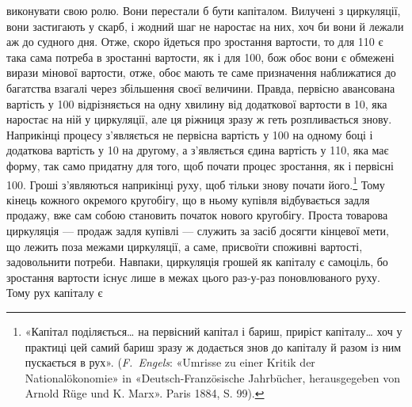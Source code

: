 \parcont{}  %
виконувати свою ролю. Вони перестали б бути капіталом. Вилучені
з циркуляції, вони застигають у скарб, і жодний шаг не наростає
на них, хоч би вони й лежали аж до судного дня. Отже,
скоро йдеться про зростання вартости, то для 110
є така сама потреба в зростанні вартости, як і для 100, бож обоє вони є обмежені вирази мінової вартости,
отже, обоє мають те саме призначення наближатися до багатства
взагалі через збільшення своєї величини. Правда, первісно авансована
вартість у 100 відрізняється на одну хвилину
від додаткової вартости в 10, яка наростає
на ній у циркуляції, але ця ріжниця зразу ж геть розпливається
знову. Наприкінці процесу з’являється не первісна вартість
у 100 на одному боці і додаткова вартість у
10 на другому, а з’являється єдина вартість у
110, яка має форму, так само придатну для того,
щоб почати процес зростання, як і первісні 100.
Гроші з’являються наприкінці руху, щоб тільки знову почати
його.\footnote{
«Капітал поділяється\dots{} на первісний капітал і бариш, приріст
капіталу\dots{} хоч у практиці цей самий бариш зразу ж додається знов до
капіталу й разом із ним пускається в рух». (\emph{F.~Engels}: «Umrisse zu
einer Kritik der Nationalökonomie» in «Deutsch-Französische Jahrbücher,
herausgegeben von Arnold Rüge und K. Marx». Paris 1884, S. 99).
} Тому кінець кожного окремого кругобігу, що в ньому
купівля відбувається задля продажу, вже сам собою становить
початок нового кругобігу. Проста товарова циркуляція — продаж
задля купівлі — служить за засіб досягти кінцевої мети,
що лежить поза межами циркуляції, а саме, присвоїти споживні
вартості, задовольнити потреби. Навпаки, циркуляція грошей
як капіталу є самоціль, бо зростання вартости існує лише в межах
цього раз-у-раз поновлюваного руху. Тому рух капіталу є
